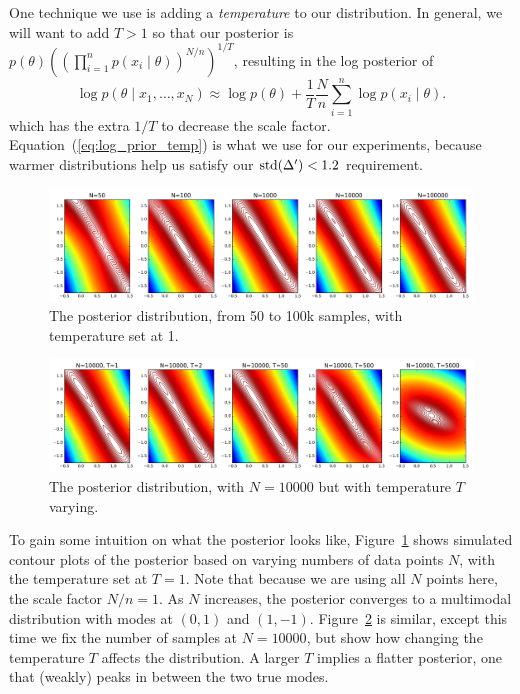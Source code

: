 \documentclass{article}
\begin{document}
One technique we use is adding a \emph{temperature} to our distribution. In general, we will want to
add $T > 1$ so that our posterior is $p(\theta)((\prod_{i=1}^n p(x_i\mid \theta))^{N/n})^{1/T}$,
resulting in the log posterior of 
\begin{equation}\label{eq:log_prior_temp}
\log p(\theta \mid x_1,\ldots,x_N) \approx \log p(\theta) + \frac{1}{T}\frac{N}{n} \sum_{i=1}^n\log p(x_i \mid \theta).
\end{equation}
which has the extra $1/T$ to decrease the scale factor. Equation~(\ref{eq:log_prior_temp}) is what
we use for our experiments, because warmer distributions help us satisfy our ${\rm std}(\Delta') <
1.2$ requirement.

\begin{figure}[t]
  \centering
  \includegraphics[width=1\linewidth]{contour_v1}
  \caption{The posterior distribution, from 50 to 100k samples, with temperature set at 1.}
  \label{fig:contour1}
\end{figure}
\begin{figure}[t]
  \centering
  \includegraphics[width=1\linewidth]{contour_v2}
  \caption{The posterior distribution, with $N=10000$ but with temperature $T$ varying.}
  \label{fig:contour2}
\end{figure}

To gain some intuition on what the posterior looks like, Figure~\ref{fig:contour1} shows simulated
contour plots of the posterior based on varying numbers of data points $N$, with the temperature set
at $T=1$. Note that because we are using all $N$ points here, the scale factor $N/n=1$. As $N$
increases, the posterior converges to a multimodal distribution with modes at $(0,1)$ and $(1,-1)$.
Figure~\ref{fig:contour2} is similar, except this time we fix the number of samples at $N=10000$,
but show how changing the temperature $T$ affects the distribution. A larger $T$ implies a flatter
posterior, one that (weakly) peaks in between the two true modes.
\end{document}
